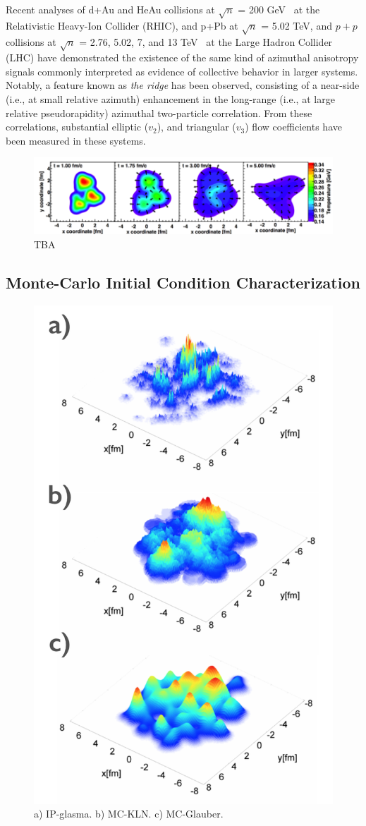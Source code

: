Recent analyses of d+Au and HeAu collisions at $\sqrt{n}$ = 200 GeV~\cite{PhysRevLett.111.212301,Adare:2014keg,Adare:2015ctn,Adamczyk:2014fcx} at the Relativistic Heavy-Ion Collider (RHIC), and p+Pb at $\sqrt{n}$ = 5.02 TeV, and $p+p$ collisions at $\sqrt{n}$ = 2.76, 5.02, 7, and 13 TeV~\cite{alice_long_2013,atlas_observation_2012,cms_observation_2012,Khachatryan:2015lva,Aad:2015gqa,Khachatryan:2010gv,Khachatryan:2016txc} at the Large Hadron Collider (LHC) have demonstrated the existence of the same kind of azimuthal anisotropy signals commonly interpreted as evidence of collective behavior in larger systems. Notably, a feature known as \textit{the ridge} has been observed, consisting of a near-side (i.e., at small relative azimuth) enhancement in the long-range (i.e., at large relative pseudorapidity) azimuthal two-particle correlation. From these correlations, substantial elliptic ($v_2$), and triangular ($v_3$) flow coefficients have been measured in these systems.
\begin{figure}[h!]
\begin{center}
\includegraphics[width=0.45\linewidth]{figs/he3au_simulation.png}
\caption{ TBA }
\end{center}
\end{figure}


\subsection{Monte-Carlo Initial Condition Characterization}
\begin{figure}[h!]
\begin{center}
\includegraphics[width=0.45\linewidth]{figs/initial_conditions.png}
\caption{ a) IP-glasma. b) MC-KLN. c) MC-Glauber.}
\end{center}
\end{figure}

